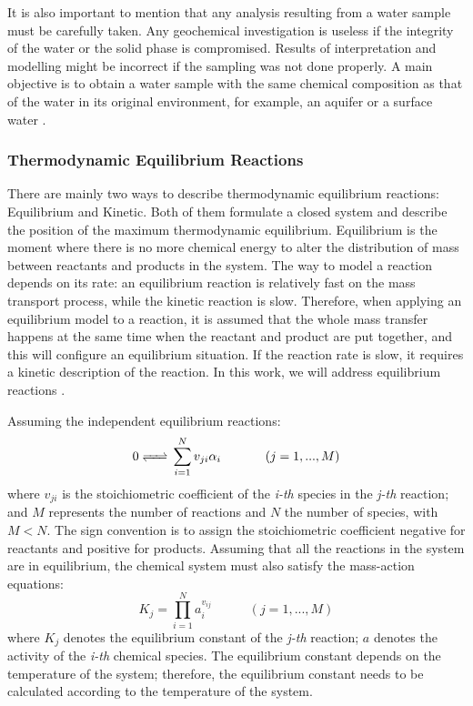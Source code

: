It is also important to mention that any analysis resulting from a water sample must be carefully taken. Any geochemical investigation is useless if the integrity of the water or the solid phase is compromised. Results of interpretation and modelling might be incorrect if the sampling was not done properly. A main objective is to obtain a water sample with the same chemical composition as that of the water in its original environment, for example, an aquifer or a surface water \cite{Deutsch:97}.

\subsubsection{Thermodynamic Equilibrium Reactions}
There are mainly two ways to describe thermodynamic equilibrium reactions: Equilibrium and Kinetic. Both of them formulate a closed system and describe the position of the maximum thermodynamic equilibrium. Equilibrium is the moment where there is no more chemical energy to alter the distribution of mass between reactants and products in the system. The way to model a reaction depends on its rate: an equilibrium reaction is relatively fast on the mass transport process, while the kinetic reaction is slow. Therefore, when applying an equilibrium model to a reaction, it is assumed that the whole mass transfer happens at the same time when the reactant and product are put together, and this will configure an equilibrium situation. If the reaction rate is slow, it requires a kinetic description of the reaction. In this work, we will address equilibrium reactions \cite{Nordstrom:86}. 

Assuming the independent equilibrium reactions:
\begin{equation}\label{reaction}
0 \ce{<=>} \sum\limits_{i=1}^N  v_{ji} \alpha_i \hspace{35pt}    (j = 1, ... , M)
\end{equation}
where $v_{ji}$ is the stoichiometric coefficient of the \emph{i-th} species in the \emph{j-th} reaction; and $M$ represents the number of reactions and $N$ the number of species, with $M < N$. The sign convention is to assign the stoichiometric coefficient negative for reactants and positive for products. Assuming that all the reactions in the system are in equilibrium, the chemical system must also satisfy the mass-action equations:
\begin{equation}\label{eq:massaction}
K_j =  \prod\limits_{i=1}^N  a_i^{v_{ij}} \hspace{35pt}    (j = 1, ... , M)
\end{equation}
where $K_j$ denotes the equilibrium constant of the \emph{j-th} reaction; $a$ denotes the activity of the \emph{i-th} chemical species. The equilibrium constant depends on the temperature of the system; therefore, the equilibrium constant needs to be calculated according to the temperature of the system. 

